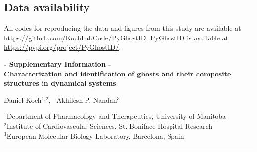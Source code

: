 \documentclass{article}
\theoremstyle{definition}
\begin{document}
\begin{refsection}
\subsection*{Data availability}
\small{All codes for reproducing the data and figures from this study are available at \url{https://github.com/KochLabCode/PyGhostID}. PyGhostID is available at \url{https://pypi.org/project/PyGhostID/}.}


% 
% 

\printbibliography
\end{refsection}

\newpage 
\begin{refsection}
\thispagestyle{plain}
\begin{center}
\textbf{\Large  - Supplementary Information -}\\
\vspace{0.3cm}
\textbf{\Large Characterization and identification of ghosts and their composite structures in dynamical systems}

\vspace{0.5cm}

Daniel Koch$^{1,2}$, \ Akhilesh P. Nandan$^{3}$

\vspace{0.3cm}

{\small $^{1}$Department of Pharmacology and Therapeutics, University of Manitoba\\
$^{2}$Institute of Cardiovascular Sciences, St. Boniface Hospital Research\\
$^{3}$European Molecular Biology Laboratory, Barcelona, Spain}
\end{center}
\setcounter{section}{0}
\setcounter{subsection}{0}
\renewcommand{\theHsection}{SM.\thesection}
\renewcommand{\theHsubsection}{SM.\thesubsection}
\renewcommand{\theHsubsubsection}{SM.\thesubsubsection}

\startcontents[SM]

\noindent\rule{\linewidth}{0.4pt}\par\bigskip



\end{refsection}
\end{document}
